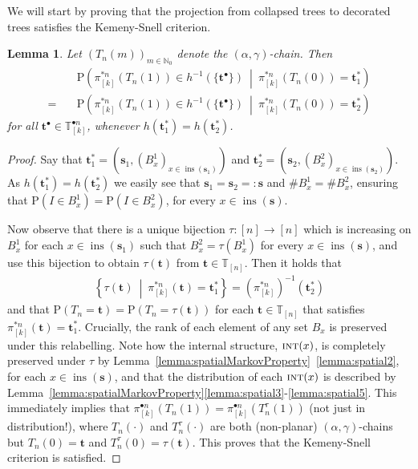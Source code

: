 \documentclass[a4paper, final]{amsart}
\theoremstyle{plain}
\newtheorem{lemma}[thm]{Lemma}
\theoremstyle{definition}
\newcommand{\tree}[1][t]{\boldsymbol{#1}}
\newcommand{\T}{\mathbb{T}}
\DeclareMathOperator{\insertable}{ins}
\DeclareMathOperator{\intstruct}{\textsc{int}}
\newcommand{\insertablef}[1][\tree]{\insertable({\tree[#1]})}
\renewcommand{\P}{\mathrm{P}}
\newcommand{\N}{\mathbb{N}}
\begin{document}
%
We will start by proving that the projection from collapsed trees to decorated trees satisfies the Kemeny-Snell criterion.
%
\begin{lemma}\label{lemma:kemeny-snell}
  Let ${\left( T_n(m) \right)}_{m \in \N_0}$ denote the $(\alpha, \gamma)$-chain.
  Then 
  \begin{align*}
    &\P \left( \pi_{[k]}^{* n} \left( T_n(1) \right) \in h^{-1}( \{ \tree^\bullet \}) \ \middle \vert \ \pi_{[k]}^{* n} \left( T_n(0) \right) = \tree_1^* \right) \nonumber \\
    = \quad &\P \left( \pi_{[k]}^{* n} \left( T_n(1) \right) \in h^{-1}( \{ \tree^\bullet \}) \ \middle \vert \ \pi_{[k]}^{* n} \left( T_n(0) \right) = \tree_2^* \right)
  \end{align*}
  for all $\tree^\bullet \in \T_{[k]}^{\bullet n}$, whenever $h (\tree_1^*) = h (\tree_2^*)$.
\end{lemma}
%
\begin{proof}
  Say that $\tree_1^* = \left( {\tree[s]_1}, {\left( B_x^1 \right)}_{x \in \insertable \left({\tree[s]}_1\right)} \right)$ and $\tree_2^* = \left( {\tree[s]_2}, {\left( B_x^2 \right)}_{x \in \insertable \left({\tree[s]}_2\right)} \right)$.
  As $h (\tree_1^*) = h (\tree_2^*)$ we easily see that ${\tree[s]}_1 = {\tree[s]}_2 =: \tree[s]$ and $\# B_x^1 = \# B_x^2$, ensuring that $\P \left( I \in B_x^1 \right) = \P \left( I \in B_x^2 \right)$, for every $x \in \insertablef[s]$.

Now observe that there is a unique bijection $\tau \colon [n] \to [n]$ which is increasing on $B_x^1$ for each $x \in \insertable \left( {\tree[s]}_1 \right)$ such that $B_x^2 = \tau \left( B_x^1 \right)$ for every $x \in \insertable \left( \tree[s] \right)$, and use this bijection to obtain $\tau(\tree)$ from $\tree \in \T_{[n]}$.
  Then it holds that
  \begin{align*}
    \left\{ \tau (\tree) \ \middle \vert \ \pi_{[k]}^{* n} \left( \tree \right) = \tree_1^* \right\}
    = {\left( \pi_{[k]}^{* n} \right)}^{-1} \left( \tree_2^* \right)
  \end{align*}
  and that $\P \left( T_n = \tree \right) = \P \left( T_n = \tau (\tree) \right)$ for each $\tree \in \T_{[n]}$ that satisfies $\pi_{[k]}^{* n} (\tree) = \tree_1^*$.
  Crucially, the rank of each element of any set $B_x$ is preserved under this relabelling.
  Note how the internal structure, $\intstruct (x)$, is completely preserved under $\tau$ by Lemma~\ref{lemma:spatialMarkovProperty}~\ref{lemma:spatial2}, for each $x \in \insertable \left( \tree[s] \right)$, and that the distribution of each $\intstruct (x)$ is described by Lemma~\ref{lemma:spatialMarkovProperty}\ref{lemma:spatial3}-\ref{lemma:spatial5}.
  This immediately implies that $\pi_{[k]}^{\bullet n} \left( T_n(1) \right) = \pi_{[k]}^{\bullet n} \left( T_n^\tau(1) \right)$ (not just in distribution!), where $T_n(\cdot)$ and $T_n^\tau(\cdot)$ are both (non-planar) $(\alpha, \gamma)$-chains but $T_n(0) = \tree$ and $T_n^\tau(0) = \tau (\tree)$.
  This proves that the Kemeny-Snell criterion is satisfied.
\end{proof}
\end{document}
